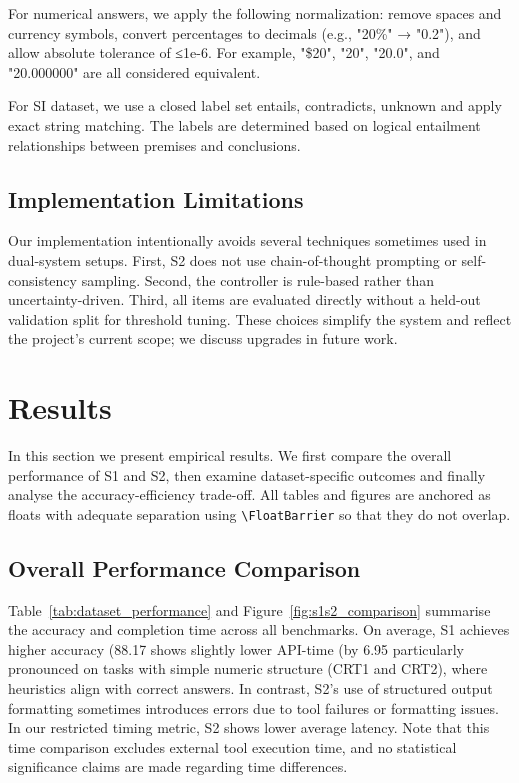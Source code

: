 \documentclass[11pt]{article}
\begin{document}
For numerical answers, we apply the following normalization: remove spaces and currency symbols, convert percentages to decimals (e.g., "20\%" → "0.2"), and allow absolute tolerance of ≤1e-6. For example, "\$20", "20", "20.0", and "20.000000" are all considered equivalent.

For SI dataset, we use a closed label set {entails, contradicts, unknown} and apply exact string matching. The labels are determined based on logical entailment relationships between premises and conclusions.

\subsection{Implementation Limitations}
Our implementation intentionally avoids several techniques sometimes used in dual-system setups.
First, S2 does not use chain-of-thought prompting or self-consistency sampling.
Second, the controller is rule-based rather than uncertainty-driven.
Third, all items are evaluated directly without a held-out validation split for threshold tuning.
These choices simplify the system and reflect the project's current scope; we discuss upgrades in future work.
\section{Results}
\label{sec:results}
In this section we present empirical results.  We first compare the overall
performance of S1 and S2, then examine dataset-specific outcomes and finally
analyse the accuracy-efficiency trade-off.  All tables and figures are
anchored as floats with adequate separation using \verb|\FloatBarrier| so
that they do not overlap.

\subsection{Overall Performance Comparison}
Table~\ref{tab:dataset_performance} and Figure~\ref{fig:s1s2_comparison}
summarise the accuracy and completion time across all benchmarks.  On
average, S1 achieves higher accuracy (88.17%
shows slightly lower API-time (by 6.95%
particularly pronounced on tasks with simple numeric structure (CRT1 and
CRT2), where heuristics align with correct answers.  In contrast, S2's use
of structured output formatting sometimes introduces errors due to tool failures
or formatting issues.  In our restricted timing metric, S2 shows lower average latency.
Note that this time comparison excludes external tool execution time, and no statistical significance claims are made regarding time differences.
\end{document}
